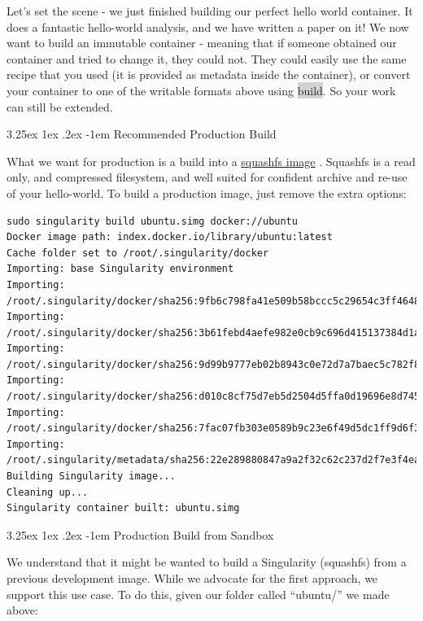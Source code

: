 \documentclass[a4paper]{article}
\makeatletter
\newcounter{subsubsubsection}[subsubsection]
\renewcommand\paragraph{\@startsection{paragraph}{5}{\z@}%
  {3.25ex \@plus1ex \@minus.2ex}%
  {-1em}%
  {\normalfont\normalsize\bfseries}}
\makeatother
\begin{document}
	
	Let’s set the scene - we just finished building our perfect hello world container. It does a fantastic hello-world analysis, and we have written a paper on it! We now want to build an immutable container - meaning that if someone obtained our container and tried to change it, they could not. They could easily use the same recipe that you used (it is provided as metadata inside the container), or convert your container to one of the writable formats above using \colorbox{lightgray}{build}. So your work can still be extended.

		\paragraph{Recommended Production Build}
		
		What we want for production is a build into a  \href{https://en.wikipedia.org/wiki/SquashFS}{squashfs image} . Squashfs is a read only, and compressed filesystem, and well suited for confident archive and re-use of your hello-world. To build a production image, just remove the extra options:
		
\begin{lstlisting}[frame=single] 
sudo singularity build ubuntu.simg docker://ubuntu
Docker image path: index.docker.io/library/ubuntu:latest
Cache folder set to /root/.singularity/docker
Importing: base Singularity environment
Importing: /root/.singularity/docker/sha256:9fb6c798fa41e509b58bccc5c29654c3ff4648b608f5daa67c1aab6a7d02c118.tar.gz
Importing: /root/.singularity/docker/sha256:3b61febd4aefe982e0cb9c696d415137384d1a01052b50a85aae46439e15e49a.tar.gz
Importing: /root/.singularity/docker/sha256:9d99b9777eb02b8943c0e72d7a7baec5c782f8fd976825c9d3fb48b3101aacc2.tar.gz
Importing: /root/.singularity/docker/sha256:d010c8cf75d7eb5d2504d5ffa0d19696e8d745a457dd8d28ec6dd41d3763617e.tar.gz
Importing: /root/.singularity/docker/sha256:7fac07fb303e0589b9c23e6f49d5dc1ff9d6f3c8c88cabe768b430bdb47f03a9.tar.gz
Importing: /root/.singularity/metadata/sha256:22e289880847a9a2f32c62c237d2f7e3f4eae7259bf1d5c7ec7ffa19c1a483c8.tar.gz
Building Singularity image...
Cleaning up...
Singularity container built: ubuntu.simg 
\end{lstlisting}
		\paragraph{Production Build from Sandbox}
		
		We understand that it might be wanted to build a Singularity (squashfs) from a previous development image. While we advocate for the first approach, we support this use case. To do this, given our folder called “ubuntu/” we made above:
		
\end{document}
